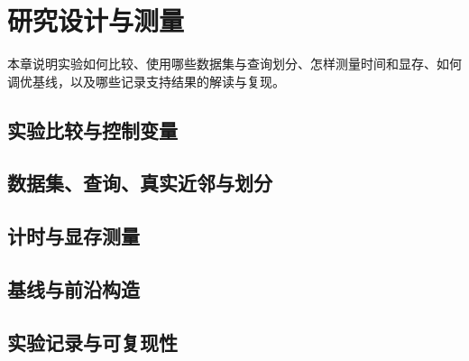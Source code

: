 \chapter{研究设计与测量}
\label{ch:methodology}
本章说明实验如何比较、使用哪些数据集与查询划分、怎样测量时间和显存、如何调优基线，以及哪些记录支持结果的解读与复现。

\section{实验比较与控制变量}
\label{sec:3-1}


\section{数据集、查询、真实近邻与划分}
\label{sec:3-2}


\section{计时与显存测量}
\label{sec:3-3}


\section{基线与前沿构造}
\label{sec:3-4}
\label{sec:b-grids}


\section{实验记录与可复现性}
\label{sec:3-5}

